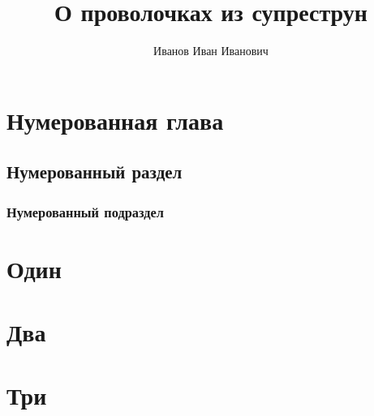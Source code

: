 \documentclass[a4paper,10pt]{report}
\title{О проволочках из супреструн}
\author{Иванов Иван Иванович}
\begin{document}
  \maketitle
  \chapter{Нумерованная глава}
  \label{c:num_chap}
  \section{Нумерованный раздел}
  \label{s:num_sec}
  \subsection{Нумерованный подраздел}
  \label{ss:num_subsec}

  \appendix
  \chapter{Один}
  \chapter{Два}
  \chapter{Три}
\end{document}
